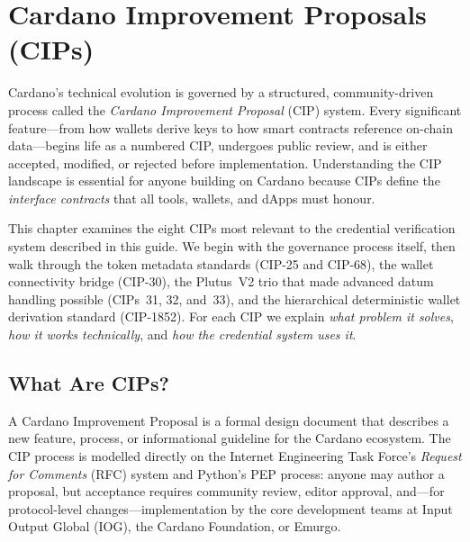 
\chapter{Cardano Improvement Proposals (CIPs)}
\label{ch:cips}


Cardano's technical evolution is governed by a structured, community-driven
process called the \emph{Cardano Improvement Proposal} (CIP) system.  Every
significant feature---from how wallets derive keys to how smart contracts
reference on-chain data---begins life as a numbered CIP, undergoes public
review, and is either accepted, modified, or rejected before implementation.
Understanding the CIP landscape is essential for anyone building on Cardano
because CIPs define the \emph{interface contracts} that all tools, wallets,
and dApps must honour.

This chapter examines the eight CIPs most relevant to the credential
verification system described in this guide.  We begin with the governance
process itself, then walk through the token metadata standards (CIP-25 and
CIP-68), the wallet connectivity bridge (CIP-30), the Plutus~V2 trio that
made advanced datum handling possible (CIPs~31, 32, and~33), and the
hierarchical deterministic wallet derivation standard (CIP-1852).  For each
CIP we explain \emph{what problem it solves}, \emph{how it works
technically}, and \emph{how the credential system uses it}.


\section{What Are CIPs?}
\label{sec:cips-overview}

A Cardano Improvement Proposal is a formal design document that describes a
new feature, process, or informational guideline for the Cardano ecosystem.
The CIP process is modelled directly on the Internet Engineering Task Force's
\emph{Request for Comments} (RFC) system and Python's PEP process: anyone may
author a proposal, but acceptance requires community review, editor approval,
and---for protocol-level changes---implementation by the core development
teams at Input Output Global (IOG), the Cardano Foundation, or Emurgo.


